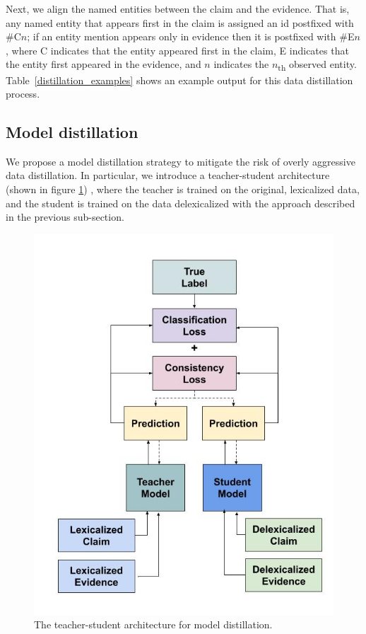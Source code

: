 Next, we align the named entities between the claim and the evidence. That is, any named entity that appears first in the claim is assigned an id postfixed with \#C$n$; if an entity mention appears only in evidence then it is postfixed with \#E$n$, where C indicates that the entity appeared first in the claim, E indicates that the entity first appeared in the evidence, and $n$ indicates the $n$\textsubscript{th} observed entity. Table~\ref{distillation_examples} shows an example output for this data distillation process.

\subsection{Model distillation}


We propose a model distillation strategy to mitigate the risk of overly aggressive data distillation.
In particular, we introduce a  teacher-student architecture (shown in figure \ref{student_teacher_architecture}) \cite{hinton2015distilling,tarvainen2017mean,laine2016temporal,sajjadi2016regularization}, where the teacher is trained on the original, lexicalized data, and the student is trained on the data delexicalized with the approach described in the previous sub-section.


\begin{figure}[t!]
\center
\includegraphics[width=0.9\linewidth]{mainmatter/naacl21_student_teacher/student_teacher_architecture_color_changed.jpeg}
\caption{ The teacher-student architecture for model distillation.}
\label{student_teacher_architecture}

\end{figure}

